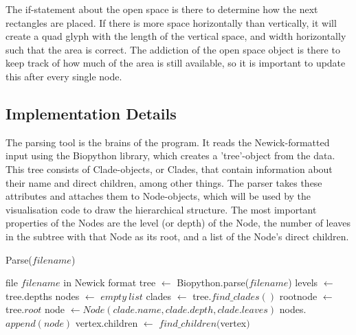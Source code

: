 \documentclass[journal, 9pt]{vgtc}                %
\begin{document}
The if-statement about the open space is there to determine how the next rectangles are placed. If there is more space horizontally than vertically, it will create a quad glyph with the length of the vertical space, and width horizontally such that the area is correct. The addiction of the open space object is there to keep track of how much of the area is still available, so it is important to 
update this after every single node. 


\subsection{Implementation Details}

The parsing tool is the brains of the program. It reads the Newick-formatted input using the Biopython library, which creates a 'tree'-object from the data. This tree consists of Clade-objects, or Clades, that contain information about their name and direct children, among other things. The parser takes these attributes and attaches them to Node-objects, which will be used by the visualisation code to draw the hierarchical structure. The most important properties of the Nodes are the level (or depth) of the Node, the number of leaves in the subtree with that Node as its root, and a list of the Node's direct children.\\
	\begin{algorithm}
		\caption{Parse($filename$)}
		\begin{algorithmic}
			\REQUIRE file $filename$ in Newick format
			\STATE tree $\leftarrow$ Biopython.parse($filename$)
			\STATE levels $\leftarrow$ tree.depths
			\STATE nodes $\leftarrow$ $empty\ list$
			\STATE clades $\leftarrow$ tree.$find\_clades()$
			\STATE rootnode $\leftarrow$ tree.$root$
			\STATE node $\leftarrow Node(clade.name, clade.depth, clade.leaves)$
			\STATE nodes.$append(node)$
			\ENDFOR
			\STATE vertex.children $\leftarrow$ $find\_children($vertex$)$
			\ENDFOR
		\end{algorithmic}
	\end{algorithm}
	
\end{document}
